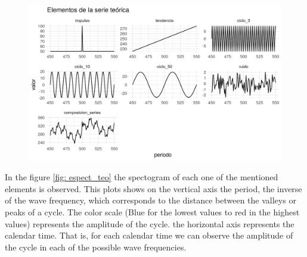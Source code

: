 \documentclass[a4paper]{article}
\begin{document}
\begin{figure}[H]
	\centering
	\includegraphics[width=\linewidth]{serie_teorica.PNG}
	\caption{} \label{fig:serie_teorica}
\end{figure}

In the figure \ref{fig: espect_teo} the spectogram of each one of the mentioned elements is observed. This plots shows on the vertical axis the period, the inverse of the wave frequency, which corresponds to the distance between the valleys or peaks of a cycle. The color scale (Blue for the lowest values to red in the highest values) represents the amplitude of the cycle. the horizontal axis represents the calendar time. That is, for each calendar time we can observe the amplitude of the cycle in each of the possible wave frequencies.
\end{document}
